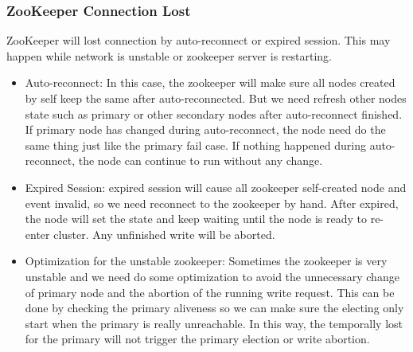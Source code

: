 \subsubsection{ZooKeeper Connection Lost}
ZooKeeper will lost connection by auto-reconnect or expired session. This may happen while network is unstable or zookeeper server is restarting.
\begin{itemize}
\item Auto-reconnect: In this case, the zookeeper will make sure all nodes created by self keep the same after auto-reconnected. But we need refresh other nodes state such as primary or other secondary nodes after auto-reconnect finished. If primary node has changed during auto-reconnect, the node need do the same thing just like the primary fail case. If nothing happened during auto-reconnect, the node can continue to run without any change.
\item Expired Session: expired session will cause all zookeeper self-created node and event invalid, so we need reconnect to the zookeeper by hand. After expired, the node will set the state and keep waiting until the node is ready to re-enter cluster. Any unfinished write will be aborted.
\item Optimization for the unstable zookeeper: Sometimes the zookeeper is very unstable and we need do some optimization to avoid the unnecessary change of primary node and the abortion of the running write request. This can be done by checking the primary aliveness so we can make sure the electing only start when the primary is really unreachable. In this way, the temporally lost for the primary will not trigger the primary election or write abortion.  
\end{itemize}
 
